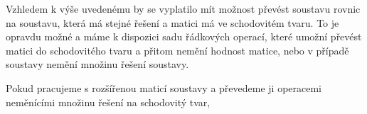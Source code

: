 \documentclass[12pt]{article}
\begin{document}
Vzhledem k výše uvedenému by se vyplatilo mít možnost převést soustavu rovnic na soustavu, která má stejné řešení a matici má ve schodovitém tvaru. To je opravdu možné a máme k dispozici sadu řádkových operací, které umožní převést matici do schodovitého tvaru a přitom nemění hodnost matice, nebo v případě soustavy nemění množinu řešení soustavy. 

Pokud pracujeme s rozšířenou maticí soustavy a převedeme ji operacemi neměnícími množinu řešení na schodovitý tvar, 
\end{document}
